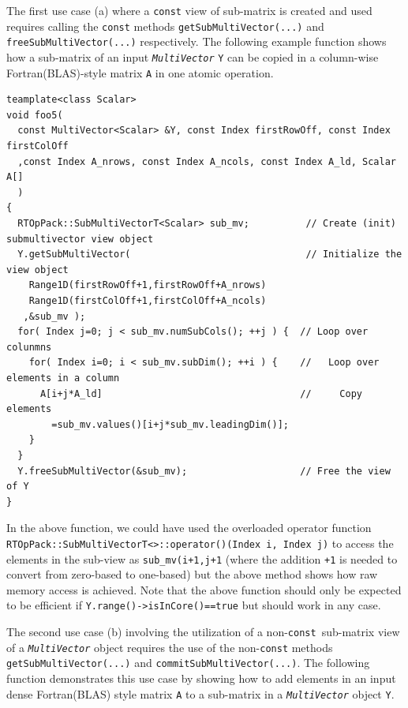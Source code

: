 The first use case (a) where a {}\texttt{const} view of sub-matrix is
created and used requires calling the {}\texttt{const} methods
{}\texttt{get\-Sub\-Multi\-Vector(...)} and
{}\texttt{free\-Sub\-Multi\-Vector(...)}  respectively.  The following
example function shows how a sub-matrix of an input
{}\texttt{\textit{Multi\-Vector}} {}\texttt{Y} can be copied in a
column-wise Fortran(BLAS)-style matrix {}\texttt{A} in one atomic
operation.

{\scriptsize\begin{verbatim}
teamplate<class Scalar>
void foo5(
  const MultiVector<Scalar> &Y, const Index firstRowOff, const Index firstColOff
  ,const Index A_nrows, const Index A_ncols, const Index A_ld, Scalar A[]
  )
{
  RTOpPack::SubMultiVectorT<Scalar> sub_mv;          // Create (init) submultivector view object
  Y.getSubMultiVector(                               // Initialize the view object
    Range1D(firstRowOff+1,firstRowOff+A_nrows)
    Range1D(firstColOff+1,firstColOff+A_ncols)
   ,&sub_mv );
  for( Index j=0; j < sub_mv.numSubCols(); ++j ) {  // Loop over colunmns
    for( Index i=0; i < sub_mv.subDim(); ++i ) {    //   Loop over elements in a column
      A[i+j*A_ld]                                   //     Copy elements
        =sub_mv.values()[i+j*sub_mv.leadingDim()];
    }
  }
  Y.freeSubMultiVector(&sub_mv);                    // Free the view of Y
}
\end{verbatim}}

In the above function, we could have used the overloaded operator
function
{}\texttt{RTOpPack::\-Sub\-Multi\-VectorT<>::\-operator()(Index i,
Index j)} to access the elements in the sub-view as
{}\texttt{sub\_mv(i+1,j+1} (where the addition {}\texttt{+1} is needed
to convert from zero-based to one-based) but the above method shows
how raw memory access is achieved.  Note that the above function
should only be expected to be efficient if
{}\texttt{Y.range()->isInCore()==true} but should work in any case.

The second use case (b) involving the utilization of a
non-{}\texttt{const}\ sub-matrix view of a
{}\texttt{\textit{Multi\-Vector}} object requires the use of the
non-{}\texttt{const} methods {}\texttt{get\-Sub\-Multi\-Vector(...)}
and {}\texttt{commit\-Sub\-Multi\-Vector(...)}.  The following
function demonstrates this use case by showing how to add elements in
an input dense Fortran(BLAS) style matrix {}\texttt{A} to a sub-matrix
in a {}\texttt{\textit{Multi\-Vector}} object {}\texttt{Y}.

